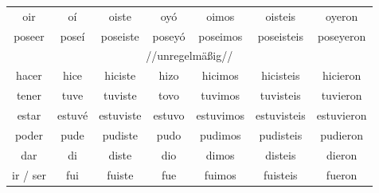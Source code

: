 \begin{tabular}{ccccccc}
oir & oí & oiste & oyó & oimos & oisteis & oyeron \\
poseer & poseí & poseiste & poseyó & poseimos & poseisteis & poseyeron \\
\midrule
\multicolumn{7}{c}{//unregelmäßig//} \\
\midrule
hacer & hice & hiciste & hizo & hicimos & hicisteis & hicieron \\
tener & tuve & tuviste & tovo & tuvimos & tuvisteis & tuvieron \\
estar & estuvé & estuviste & estuvo & estuvimos & estuvisteis & estuvieron \\
poder & pude & pudiste & pudo & pudimos & pudisteis & pudieron \\
dar & di & diste & dio & dimos & disteis & dieron \\
ir / ser & fui & fuiste & fue & fuimos & fuisteis & fueron \\
\bottomrule
\end{tabular}

